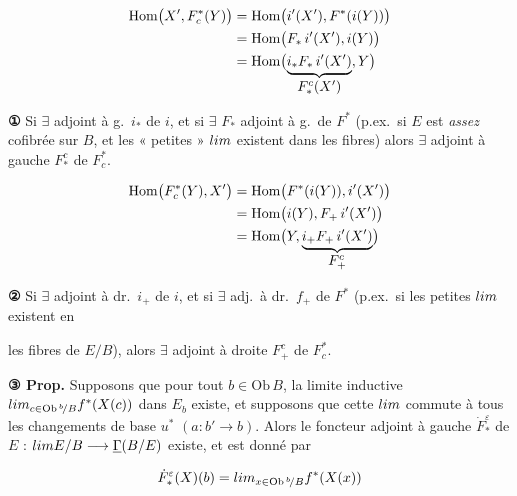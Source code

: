 \documentclass[11pt,a4paper]{article}
\begin{document}
\begin{align}
\mathrm{Hom}\bigl(X', F^{*}_{c}(Y)\bigr)
  &= \mathrm{Hom}\bigl(i'(X'), F^{*}(i(Y))\bigr) \notag \\
  &= \mathrm{Hom}\bigl(F_{*}\,i'(X'), i(Y)\bigr) \notag \\
  &= \mathrm{Hom}\bigl(\underbrace{i_{*}F_{*}\,i'(X')}
     _{\textstyle F^{c}_{*}(X')}, Y\bigr) \notag
\end{align}

\textbf{①} Si $\exists$ adjoint à g.\ $i_{*}$ de $i$, et si $\exists$ $F_{*}$
adjoint à g.\ de $F^{*}$ (p.ex.\ si $E$ est \emph{assez} cofibrée sur $B$, et
les « petites » $\varprojlim$ existent dans les fibres) alors $\exists$ adjoint
à gauche $F^{c}_{*}$ de $F^{*}_{c}$.

\begin{align}
\mathrm{Hom}\bigl(F^{*}_{c}(Y), X'\bigr)
  &= \mathrm{Hom}\bigl(F^{*}(i(Y)), i'(X')\bigr) \notag \\
  &= \mathrm{Hom}\bigl(i(Y), F_{+}\,i'(X')\bigr) \notag \\
  &= \mathrm{Hom}\bigl(Y, \underbrace{i_{+}F_{+}\,i'(X')}
     _{\textstyle F^{c}_{+}}\bigr) \notag
\end{align}


\textbf{②} Si $\exists$ adjoint à dr.\ $i_{+}$  de $i$, et si
$\exists$ adj.\ à dr.\ $f_{+}$ de $F^{*}$ (p.ex.\ si les petites $\varprojlim$
existent en


les fibres de $E/B$), alors $\exists$ adjoint à droite $F^{c}_{+}$ de
$F^{*}_{c}$.

\textbf{③ Prop.} Supposons que pour tout $b \in \mathrm{Ob}\,B$, la limite
inductive $\varinjlim_{c \in \mathrm{Ob}\,{}^{b}\!/B} f^{*}(X(c))$ dans $E_{b}$
existe, et supposons que cette $\varinjlim$ commute à tous les changements de
base $u^{*}$ $(a : b' \to b)$. Alors le foncteur adjoint à gauche
$\dot{F}^{\varepsilon}_{*}$ de $E$ : $\varprojlim E/B \longrightarrow
\underline{\Gamma}(B/E)$ existe, et est
donné par

\[ \dot{F}^{\varepsilon}_{*}(X)(b)
   = \varinjlim_{x \in \mathrm{Ob}\,{}^{b}\!/B} f^{*}(X(x)) \]
\end{document}
